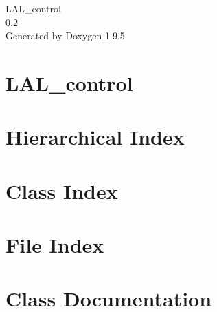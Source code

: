 \documentclass[twoside]{book}
\newcommand{\+}{\discretionary{\mbox{\scriptsize$\hookleftarrow$}}{}{}}
\newcommand{\clearemptydoublepage}{%
    \newpage{\pagestyle{empty}\cleardoublepage}%
  }
\begin{document}
  \raggedbottom
    \hypersetup{pageanchor=false,
                bookmarksnumbered=true,
                pdfencoding=unicode
               }
  \begin{titlepage}
  \vspace*{7cm}
  \begin{center}%
  {\Large LAL\+\_\+control}\\
  [1ex]\large 0.\+2 \\
  \vspace*{1cm}
  {\large Generated by Doxygen 1.9.5}\\
  \end{center}
  \end{titlepage}
  \clearemptydoublepage
  \tableofcontents
  \clearemptydoublepage
  \hypersetup{pageanchor=true}
\chapter{LAL\+\_\+control}
\label{index}\hypertarget{index}{}
\chapter{Hierarchical Index}

\chapter{Class Index}

\chapter{File Index}

\chapter{Class Documentation}






















\end{document}
